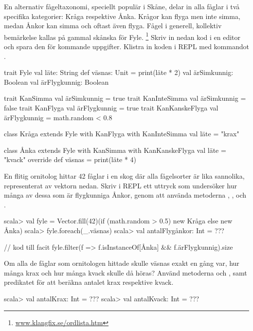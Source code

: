En alternativ fågeltaxonomi, speciellt populär i Skåne, delar in alla fåglar i två specifika kategorier: Kråga respektive Ånka. Krågor kan flyga men inte simma, medan Ånkor kan simma och oftast även flyga. Fågel i generell, kollektiv bemärkelse kallas på gammal skånska för Fyle.%
\footnote{\href{http://www.klangfix.se/ordlista.htm}{www.klangfix.se/ordlista.htm}}
Skriv in nedan kod i en editor och spara den för kommande uppgifter. Klistra in koden i REPL med kommandot .

\begin{Code}
trait Fyle { 
  val läte: String
  def väsnas: Unit = print(läte * 2)
  val ärSimkunnig: Boolean
  val ärFlygkunnig: Boolean
}

trait KanSimma       { val ärSimkunnig = true }
trait KanInteSimma   { val ärSimkunnig = false }
trait KanFlyga       { val ärFlygkunnig = true }
trait KanKanskeFlyga { val ärFlygkunnig = math.random < 0.8 }

class Kråga extends Fyle with KanFlyga with KanInteSimma {
  val läte = "krax"  
} 

class Ånka extends Fyle with KanSimma with KanKanskeFlyga {
  val läte = "kvack"
  override def väsnas = print(läte * 4)
} 
\end{Code}

\Subtask En flitig ornitolog hittar 42 fåglar i en skog där alla fågelsorter är lika sannolika, representerat av vektorn  nedan. Skriv i REPL ett uttryck som undersöker hur många av dessa som är flygkunniga Ånkor, genom att använda metoderna , ,  och .   
\begin{REPL}
scala> val fyle = 
         Vector.fill(42)(if (math.random > 0.5) new Kråga else new Ånka)
scala> fyle.foreach(_.väsnas)
scala> val antalFlygånkor: Int = ??? 
\end{REPL}

\begin{Code}
// kod till facit
fyle.filter(f => f.isInstanceOf[Ånka] && f.ärFlygkunnig).size
\end{Code}

\Subtask Om alla de fåglar som ornitologen hittade skulle väsnas exakt en gång var, hur många krax och hur många kvack skulle då höras? Använd metoderna  och , samt predikatet  för att beräkna antalet krax respektive kvack.
\begin{REPL}
scala> val antalKrax: Int = ???
scala> val antalKvack: Int = ??? 
\end{REPL}

